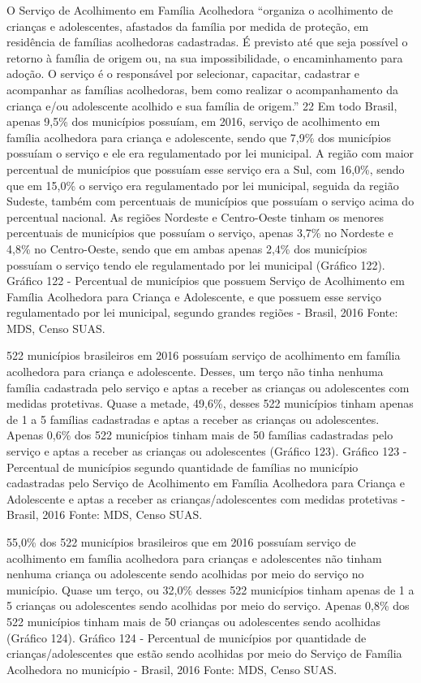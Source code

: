 \documentclass[
  brazilian]{report}
\begin{document}
O Serviço de Acolhimento em Família Acolhedora ``organiza o acolhimento
de crianças e adolescentes, afastados da família por medida de proteção,
em residência de famílias acolhedoras cadastradas. É previsto até que
seja possível o retorno à família de origem ou, na sua impossibilidade,
o encaminhamento para adoção. O serviço é o responsável por selecionar,
capacitar, cadastrar e acompanhar as famílias acolhedoras, bem como
realizar o acompanhamento da criança e/ou adolescente acolhido e sua
família de origem.'' 22 Em todo Brasil, apenas 9,5\% dos municípios
possuíam, em 2016, serviço de acolhimento em família acolhedora para
criança e adolescente, sendo que 7,9\% dos municípios possuíam o serviço
e ele era regulamentado por lei municipal. A região com maior percentual
de municípios que possuíam esse serviço era a Sul, com 16,0\%, sendo que
em 15,0\% o serviço era regulamentado por lei municipal, seguida da
região Sudeste, também com percentuais de municípios que possuíam o
serviço acima do percentual nacional. As regiões Nordeste e Centro-Oeste
tinham os menores percentuais de municípios que possuíam o serviço,
apenas 3,7\% no Nordeste e 4,8\% no Centro-Oeste, sendo que em ambas
apenas 2,4\% dos municípios possuíam o serviço tendo ele regulamentado
por lei municipal (Gráfico 122). Gráfico 122 - Percentual de municípios
que possuem Serviço de Acolhimento em Família Acolhedora para Criança e
Adolescente, e que possuem esse serviço regulamentado por lei municipal,
segundo grandes regiões - Brasil, 2016 Fonte: MDS, Censo SUAS.

522 municípios brasileiros em 2016 possuíam serviço de acolhimento em
família acolhedora para criança e adolescente. Desses, um terço não
tinha nenhuma família cadastrada pelo serviço e aptas a receber as
crianças ou adolescentes com medidas protetivas. Quase a metade, 49,6\%,
desses 522 municípios tinham apenas de 1 a 5 famílias cadastradas e
aptas a receber as crianças ou adolescentes. Apenas 0,6\% dos 522
municípios tinham mais de 50 famílias cadastradas pelo serviço e aptas a
receber as crianças ou adolescentes (Gráfico 123). Gráfico 123 -
Percentual de municípios segundo quantidade de famílias no município
cadastradas pelo Serviço de Acolhimento em Família Acolhedora para
Criança e Adolescente e aptas a receber as crianças/adolescentes com
medidas protetivas - Brasil, 2016 Fonte: MDS, Censo SUAS.

55,0\% dos 522 municípios brasileiros que em 2016 possuíam serviço de
acolhimento em família acolhedora para crianças e adolescentes não
tinham nenhuma criança ou adolescente sendo acolhidas por meio do
serviço no município. Quase um terço, ou 32,0\% desses 522 municípios
tinham apenas de 1 a 5 crianças ou adolescentes sendo acolhidas por meio
do serviço. Apenas 0,8\% dos 522 municípios tinham mais de 50 crianças
ou adolescentes sendo acolhidas (Gráfico 124). Gráfico 124 - Percentual
de municípios por quantidade de crianças/adolescentes que estão sendo
acolhidas por meio do Serviço de Família Acolhedora no município -
Brasil, 2016 Fonte: MDS, Censo SUAS.
\end{document}
